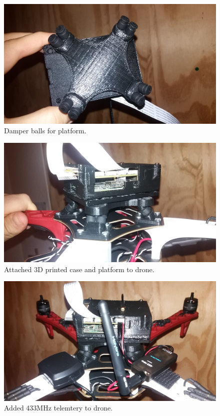 \begin{figure}
\centering
\includegraphics[scale=0.1]{images/drone-build-damper-balls.jpg}
\caption{Damper balls for platform.}
\label{fig:frame}
\end{figure}

\begin{figure}
\centering
\includegraphics[scale=0.1]{images/drone-build-case-ondrone.jpg}
\caption{Attached 3D printed case and platform to drone.}
\label{fig:frame}
\end{figure}

\begin{figure}
\centering
\includegraphics[scale=0.1]{images/drone-build-433.jpg}
\caption{Added 433MHz telemtery to drone.}
\label{fig:frame}
\end{figure}


